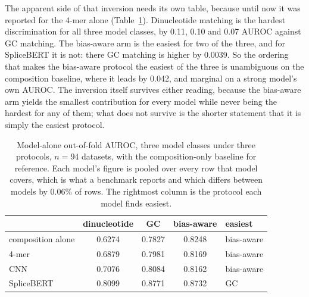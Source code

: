 The apparent side of that inversion needs its own table, because until now it was reported for
the 4-mer alone (Table~\ref{tab:alone}). Dinucleotide matching is the hardest discrimination for
all three model classes, by 0.11, 0.10 and 0.07 AUROC against GC matching. The bias-aware arm is
the easiest for two of the three, and for SpliceBERT it is not: there GC matching is higher by
0.0039. So the ordering that makes the bias-aware protocol the easiest of the three is
unambiguous on the composition baseline, where it leads by 0.042, and marginal on a strong
model's own AUROC. The inversion itself survives either reading, because the bias-aware arm
yields the smallest contribution for every model while never being the hardest for any of them;
what does not survive is the shorter statement that it is simply the easiest protocol.

\begin{table}[htbp]
\centering
\caption{Model-alone out-of-fold AUROC, three model classes under three protocols, $n=94$
datasets, with the composition-only baseline for reference. Each model's figure is pooled over
every row that model covers, which is what a benchmark reports and which differs between models
by 0.06\% of rows. The rightmost column is the protocol each model finds easiest.}
\label{tab:alone}
\small
\begin{tabular}{lcccl}
\toprule
 & dinucleotide & GC & bias-aware & easiest \\
\midrule
composition alone & 0.6274 & 0.7827 & 0.8248 & bias-aware \\
\midrule
4-mer & 0.6879 & 0.7981 & 0.8169 & bias-aware \\
CNN & 0.7076 & 0.8084 & 0.8162 & bias-aware \\
SpliceBERT & 0.8099 & 0.8771 & 0.8732 & GC \\
\bottomrule
\end{tabular}
\end{table}

